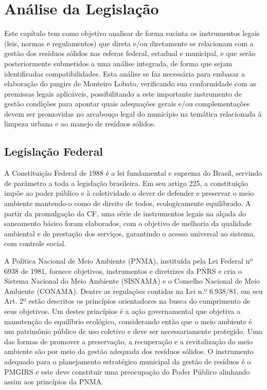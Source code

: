 	\thispagestyle{headfootimage}
	\section{Análise da Legislação}
	Este capítulo tem como objetivo analisar de forma sucinta os instrumentos legais (leis, normas e regulamentos) que direta e/ou diretamente se relacionam com a gestão dos resíduos sólidos nas esferas federal, estadual e municipal, e que serão posteriormente submetidos a uma análise integrada, de forma que sejam identificadas compatibilidades. Esta análise se faz necessária para embasar a elaboração do \acrfull{pmgirs} %
	de Monteiro Lobato, verificando sua conformidade com as premissas legais aplicáveis, possibilitando a este importante instrumento de gestão condições para apontar quais adequações gerais e/ou complementações devem ser promovidas no arcabouço legal do município na temática relacionada à limpeza urbana e ao manejo de resíduos sólidos.
	
	\subsection{Legislação Federal}
	A Constituição Federal de 1988 é a lei fundamental e suprema do Brasil, servindo de parâmetro a toda a legislação brasileira. Em seu artigo 225, a constituição impõe ao poder público e à coletividade o dever de defender e preservar o meio ambiente mantendo-o como de direito de todos, ecologicamente equilibrado. A partir da promulgação da CF, uma série de instrumentos legais na alçada do saneamento básico foram elaborados, com o objetivo de melhoria da qualidade ambiental e de prestação dos serviços, garantindo o acesso universal ao sistema, com controle social.
	
	A Política Nacional de Meio Ambiente (PNMA), instituída pela Lei Federal nº 6938 de 1981, fornece objetivos, instrumentos e diretrizes da PNRS e cria o Sistema Nacional do Meio Ambiente (SISNAMA) e o Conselho Nacional de Meio Ambiente (CONAMA). Dentre as regulações contidas na Lei n.º 6.938/81, em seu Art. 2º estão descritos os princípios orientadores na busca do cumprimento de seus objetivos. Um destes princípios é a ação governamental que objetiva a manutenção do equilíbrio ecológico, considerando então que o meio ambiente é um patrimônio público de uso coletivo e deve ser necessariamente protegido. Uma das formas de promover a preservação, a recuperação e a revitalização do meio ambiente são por meio da gestão adequada dos resíduos sólidos. O instrumento adequado para o planejamento estratégico municipal da gestão de resíduos é o PMGIRS e este deve constituir uma preocupação do Poder Público alinhando assim aos princípios da PNMA.
	
